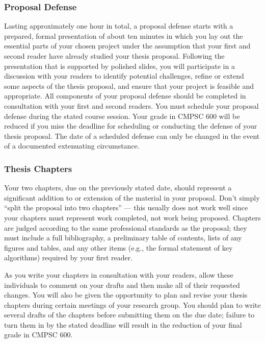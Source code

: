 \documentclass[11pt]{article}
\begin{document}
\subsubsection*{Proposal Defense}

Lasting approximately one hour in total, a proposal defense starts with a
prepared, formal presentation of about ten minutes in which you lay out the
essential parts of your chosen project under the assumption that your first and
second reader have already studied your thesis proposal. Following the
presentation that is supported by polished slides, you will participate in a
discussion with your readers to identify potential challenges, refine or extend
some aspects of the thesis proposal, and ensure that your project is feasible
and appropriate. All components of your proposal defense should be completed in
consultation with your first and second readers. You must schedule your proposal
defense during the stated course session. Your grade in CMPSC 600 will be
reduced if you miss the deadline for scheduling or conducting the defense of
your thesis proposal. The date of a scheduled defense can only be changed in the
event of a documented extenuating circumstance.

\subsubsection*{Thesis Chapters}

Your two chapters, due on the previously stated date, should represent a
significant addition to or extension of the material in your proposal. Don't
simply ``split the proposal into two chapters'' --- this usually does not work
well since your chapters must represent work completed, not work being proposed.
Chapters are judged according to the same professional standards as the
proposal; they must include a full bibliography, a preliminary table of
contents, lists of any figures and tables, and any other items (e.g., the formal
statement of key algorithms) required by your first reader.

As you write your chapters in consultation with your readers, allow these
individuals to comment on your drafts and then make all of their requested
changes. You will also be given the opportunity to plan and revise your thesis
chapters during certain meetings of your research group. You should plan to
write several drafts of the chapters before submitting them on the due date;
failure to turn them in by the stated deadline will result in the reduction of
your final grade in CMPSC 600.
\end{document}
